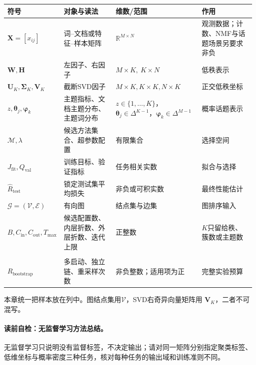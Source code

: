 \begin{symboltablebox}
\small
\begin{longtable}{@{}p{}p{}p{}p{}@{}}
\toprule
符号 & 对象与读法 & 维数/范围 & 作用 \\
\midrule
$\boldsymbol X=[x_{ij}]$ & 词--文档或特征--样本矩阵 & $\mathbb R^{M\times N}$ & 观测数据；计数、NMF与话题场景另要求非负 \\
$\boldsymbol W,\boldsymbol H$ & 左因子、右因子 & $M\times K,\ K\times N$ & 低秩表示 \\
$\boldsymbol U_K,\boldsymbol\Sigma_K,\boldsymbol V_K$ & 截断SVD因子 & $M\times K,K\times K,N\times K$ & 正交低秩坐标 \\
$z,\boldsymbol\theta_j,\boldsymbol\varphi_k$ & 主题指标、文档主题分布、主题词分布 & $z\in\{1,\ldots,K\}$，$\boldsymbol\theta_j\in\Delta^{K-1}$，$\boldsymbol\varphi_k\in\Delta^{M-1}$ & 概率话题表示 \\
$\mathcal M,\lambda$ & 候选方法集合、超参数配置 & 有限集合 & 选择空间 \\
$J_{\mathrm{fit}},Q_{\mathrm{val}}$ & 训练目标、验证指标 & 任务相关实数 & 拟合与选择 \\
$\widehat R_{\mathrm{test}}$ & 锁定测试集平均损失 & 非负或可积实数 & 最终性能估计 \\
$\mathcal G=(\mathcal V,\mathcal E)$ & 有向图 & 结点集与边集 & 图排序输入 \\
$B,C_{\mathrm{in}},C_{\mathrm{out}},T_{\max}$ & 候选配置数、内层折数、外层折数、迭代上限 & 正整数 & $K$只留给秩、簇数或主题数 \\
\shortstack{$R_{\mathrm{start}},R_{\mathrm{chain}}$\\$R_{\mathrm{bootstrap}}$} & 多启动、独立链、重采样次数 & 非负整数；适用项为正 & 完整实验预算 \\
\bottomrule
\end{longtable}
本章统一把样本放在列中。图结点集用$\mathcal V$，SVD右奇异向量矩阵用
$\boldsymbol V_K$，二者不可混写。
\end{symboltablebox}

\paragraph{读前自检：无监督学习方法总结。}无监督学习只说明没有监督标签，不决定输出；请对同一矩阵分别指定聚类标签、低维坐标与概率密度三种任务，核对每种任务的输出域和训练准则不同。\par
